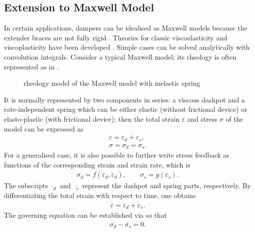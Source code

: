 \subsection{Extension to Maxwell Model}
In certain applications, dampers can be idealised as Maxwell models because the extender braces are not fully rigid \cite{Makris1991}.
Theories for classic viscoelasticity and viscoplasticity have been developed \cite{Simo1998}.
Simple cases can be solved analytically with convolution integrals.
Consider a typical Maxwell model; its rheology is often represented as in .
\begin{figure}[ht]
\centering\scriptsize
{}
\caption{rheology model of the Maxwell model with inelastic spring}\label{fig:rheology_maxwell}
\end{figure}
It is normally represented by two components in series: a viscous dashpot and a rate-independent spring which can be either elastic (without frictional device) or elasto-plastic (with frictional device); then the total strain $\varepsilon$ and stress $\sigma$ of the model can be expressed as
\begin{gather}\label{eq:equal_strain}
\varepsilon=\varepsilon_d+\varepsilon_s,\\\label{eq:equal_stress}
\sigma=\sigma_d=\sigma_s.
\end{gather}
For a generalised case, it is also possible to further write stress feedback as functions of the corresponding strain and strain rate, which is
\begin{gather}
\sigma_d=f(\varepsilon_d,\dot\varepsilon_d),\qquad\sigma_s=g(\varepsilon_s).
\end{gather}
The subscripts $\cdot_d$ and $\cdot_s$ represent the dashpot and spring parts, respectively.
By differentiating the total strain with respect to time, one obtains
\begin{gather}\label{eq:equal_strain_rate}
\dot\varepsilon=\dot\varepsilon_d+\dot\varepsilon_s.
\end{gather}
The governing equation can be established via  so that
\begin{gather}\label{eq:governing_equation}
\sigma_d-\sigma_s=0.
\end{gather}
